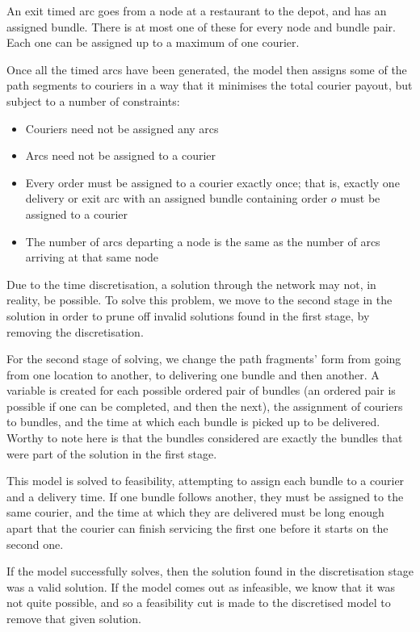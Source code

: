 \documentclass{article}
\begin{document}
An exit timed arc goes from a node at a restaurant to the depot, and has an assigned bundle. There is at most one of these for every node and bundle pair. Each one can be assigned up to a maximum of one courier.

Once all the timed arcs have been generated, the model then assigns some of the path segments to couriers in a way that it minimises the total courier payout, but subject to a number of constraints:

\begin{itemize}
\item Couriers need not be assigned any arcs
\item Arcs need not be assigned to a courier
\item Every order must be assigned to a courier exactly once; that is, exactly one delivery or exit arc with an assigned bundle containing order $o$ must be assigned to a courier
\item The number of arcs departing a node is the same as the number of arcs arriving at that same node
\end{itemize}

Due to the time discretisation, a solution through the network may not, in reality, be possible. To solve this problem, we move to the second stage in the solution in order to prune off invalid solutions found in the first stage, by removing the discretisation.

For the second stage of solving, we change the path fragments' form from going from one location to another, to delivering one bundle and then another. A variable is created for each possible ordered pair of bundles (an ordered pair is possible if one can be completed, and then the next), the assignment of couriers to bundles, and the time at which each bundle is picked up to be delivered. Worthy to note here is that the bundles considered are exactly the bundles that were part of the solution in the first stage.

This model is solved to feasibility, attempting to assign each bundle to a courier and a delivery time. If one bundle follows another, they must be assigned to the same courier, and the time at which they are delivered must be long enough apart that the courier can finish servicing the first one before it starts on the second one.

If the model successfully solves, then the solution found in the discretisation stage was a valid solution. If the model comes out as infeasible, we know that it was not quite possible, and so a feasibility cut is made to the discretised model to remove that given solution.
\end{document}
